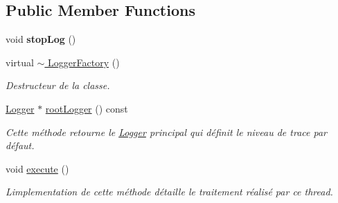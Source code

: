 \subsection*{Public Member Functions}
\begin{DoxyCompactItemize}
\item 
\mbox{\label{classlogs_1_1LoggerFactory_a4d89f093ecfe432ecb4fb8775dc4141f}} 
void {\bfseries stop\+Log} ()
\item 
\mbox{\label{classlogs_1_1LoggerFactory_ac5133c34af0e57e169fd50a260037b8b}} 
virtual \hyperlink{classlogs_1_1LoggerFactory_ac5133c34af0e57e169fd50a260037b8b}{$\sim$ Logger\+Factory} ()
\begin{DoxyCompactList}\small\item\em Destructeur de la classe. \end{DoxyCompactList}\item 
\hyperlink{classlogs_1_1Logger}{Logger} $\ast$ \hyperlink{classlogs_1_1LoggerFactory_a212aa623f4b6bee12cb39e8017dde670}{root\+Logger} () const
\begin{DoxyCompactList}\small\item\em Cette méthode retourne le \hyperlink{classlogs_1_1Logger}{Logger} principal qui définit le niveau de trace par défaut. \end{DoxyCompactList}\item 
\mbox{\label{classlogs_1_1LoggerFactory_a7d16182a3e1394b8bf14e21c9dfbda90}} 
void \hyperlink{classlogs_1_1LoggerFactory_a7d16182a3e1394b8bf14e21c9dfbda90}{execute} ()
\begin{DoxyCompactList}\small\item\em L\textquotesingle{}implementation de cette méthode détaille le traitement réalisé par ce thread. \end{DoxyCompactList}\end{DoxyCompactItemize}
